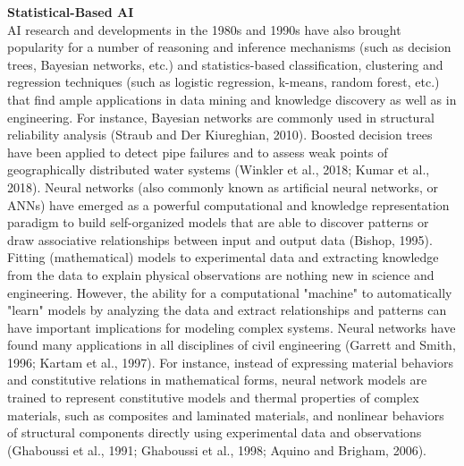 \noindent\textbf{Statistical-Based AI} \\AI research and developments in the 1980s and 1990s have also brought popularity for a number of reasoning and inference mechanisms (such as decision trees, Bayesian networks, etc.) and statistics-based classification, clustering and regression techniques (such as logistic regression, k-means, random forest, etc.) that find ample applications in data mining and knowledge discovery as well as in engineering. For instance, Bayesian networks are commonly used in structural reliability analysis (Straub and Der Kiureghian, 2010). Boosted decision trees have been applied to detect pipe failures and to assess weak points of geographically distributed water systems (Winkler et al., 2018; Kumar et al., 2018). Neural networks (also commonly known as artificial neural networks, or ANNs) have emerged as a powerful computational and knowledge representation paradigm to build self-organized models that are able to discover patterns or draw associative relationships between input and output data (Bishop, 1995). Fitting (mathematical) models to experimental data and extracting knowledge from the data to explain physical observations are nothing new in science and engineering. However, the ability for a computational "machine" to automatically "learn" models by analyzing the data and extract relationships and patterns can have important implications for modeling complex systems. Neural networks have found many applications in all disciplines of civil engineering (Garrett and Smith, 1996; Kartam et al., 1997). For instance, instead of expressing material behaviors and constitutive relations in mathematical forms, neural network models are trained to represent constitutive models and thermal properties of complex materials, such as composites and laminated materials, and nonlinear behaviors of structural components directly using experimental data and observations (Ghaboussi et al., 1991; Ghaboussi et al., 1998; Aquino and Brigham, 2006). 
\newline
 
